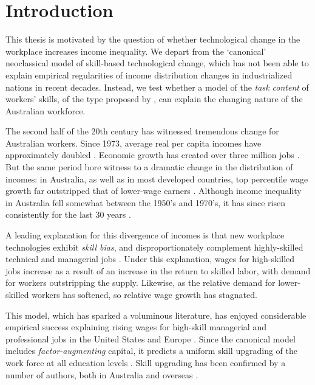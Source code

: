 \chapter{Introduction}

This thesis is motivated by the question of whether technological change in the workplace increases income inequality. We depart from the `canonical' neoclassical model of skill-based technological change, which has not been able to explain empirical regularities of income distribution changes in industrialized nations in recent decades. Instead, we test whether a model of the \emph{task content} of workers' skills, of the type proposed by \citet{Levy2003}, can explain the changing nature of the Australian workforce.

The second half of the 20th century has witnessed tremendous change for Australian workers. Since 1973, average real per capita incomes have approximately doubled \citep{NA20124}. Economic growth has created over three million jobs \citep{LFSApr2013}. But the same period bore witness to a dramatic change in the distribution of incomes: in Australia, as well as in most developed countries, top percentile wage growth far outstripped that of lower-wage earners \citep{Atkinson1997,Borland1999}. Although income inequality in Australia fell somewhat between the 1950's and 1970's, it has since risen consistently for the last 30 years \citep{Leigh2005,Gaston2009}.

A leading explanation for this divergence of incomes is that new workplace technologies exhibit \emph{skill bias}, and disproportionately complement highly-skilled technical and managerial jobs \citep{Griliches1969,Autor2006}. Under this explanation, wages for high-skilled jobs increase as a result of an increase in the return to skilled labor, with demand for workers outstripping the supply. Likewise, as the relative demand for lower-skilled workers has softened, so relative wage growth has stagnated. 

This model, which has sparked a voluminous literature, has enjoyed considerable empirical success explaining rising wages for high-skill managerial and professional jobs in the United States and Europe \citep{Katz1992}. Since the canonical model includes \emph{factor-augmenting} capital, it predicts a uniform skill upgrading of the work force at all education levels \citep{Levy2003}. Skill upgrading has been confirmed by a number of authors, both in Australia \citep{Esposto2012, Wooden2000, Cully1999} and overseas \citep{Autor2008}. 

